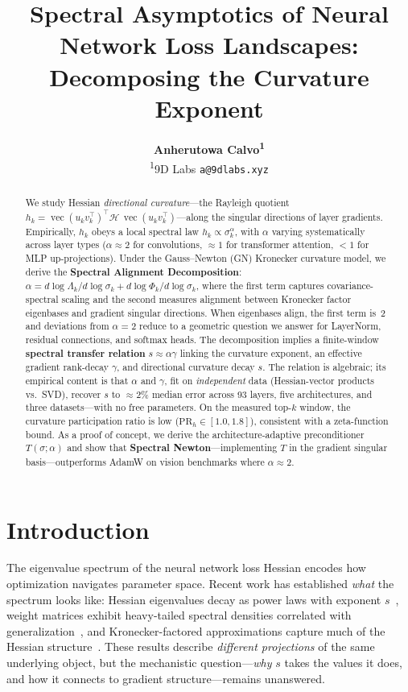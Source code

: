 \documentclass{article}
\title{Spectral Asymptotics of Neural Network Loss Landscapes:\\
Decomposing the Curvature Exponent}
\author{%
\textbf{Anherutowa Calvo\textsuperscript{1}}\\[4pt]
\textsuperscript{1}9D Labs \quad
\texttt{a@9dlabs.xyz}\\[2pt]
}
\DeclareMathOperator{\vecop}{vec}
\begin{document}
\maketitle

\begin{abstract}
We study Hessian \emph{directional curvature}---the Rayleigh quotient $h_k = \vecop(u_k v_k^\top)^\top \mathcal{H}\, \vecop(u_k v_k^\top)$---along the singular directions of layer gradients. Empirically, $h_k$ obeys a local spectral law $h_k \propto \sigma_k^\alpha$, with $\alpha$ varying systematically across layer types ($\alpha \approx 2$ for convolutions, $\approx 1$ for transformer attention, $< 1$ for MLP up-projections). Under the Gauss--Newton (GN) Kronecker curvature model, we derive the \textbf{Spectral Alignment Decomposition}: $\alpha = d\log\Lambda_k/d\log\sigma_k + d\log\Phi_k/d\log\sigma_k$, where the first term captures covariance-spectral scaling and the second measures alignment between Kronecker factor eigenbases and gradient singular directions. When eigenbases align, the first term is~2 and deviations from $\alpha = 2$ reduce to a geometric question we answer for LayerNorm, residual connections, and softmax heads. The decomposition implies a finite-window \textbf{spectral transfer relation} $s \approx \alpha\gamma$ linking the curvature exponent, an effective gradient rank-decay $\gamma$, and directional curvature decay $s$. The relation is algebraic; its empirical content is that $\alpha$ and $\gamma$, fit on \emph{independent} data (Hessian-vector products vs.\ SVD), recover $s$ to $\approx$2\% median error across 93 layers, five architectures, and three datasets---with no free parameters. On the measured top-$k$ window, the curvature participation ratio is low ($\mathrm{PR}_h \in [1.0, 1.8]$), consistent with a zeta-function bound. As a proof of concept, we derive the architecture-adaptive preconditioner $T(\sigma;\alpha)$ and show that \textbf{Spectral Newton}---implementing $T$ in the gradient singular basis---outperforms AdamW on vision benchmarks where $\alpha \approx 2$.
\end{abstract}

\section{Introduction}

The eigenvalue spectrum of the neural network loss Hessian encodes how optimization navigates parameter space. Recent work has established \emph{what} the spectrum looks like: Hessian eigenvalues decay as power laws with exponent $s$~\cite{tang2025hessian,wu2020dissecting}, weight matrices exhibit heavy-tailed spectral densities correlated with generalization~\cite{martin2021implicit}, and Kronecker-factored approximations capture much of the Hessian structure~\cite{martens2015kfac,grosse2016kfc}. These results describe \emph{different projections} of the same underlying object, but the mechanistic question---\emph{why} $s$ takes the values it does, and how it connects to gradient structure---remains unanswered.
\end{document}
